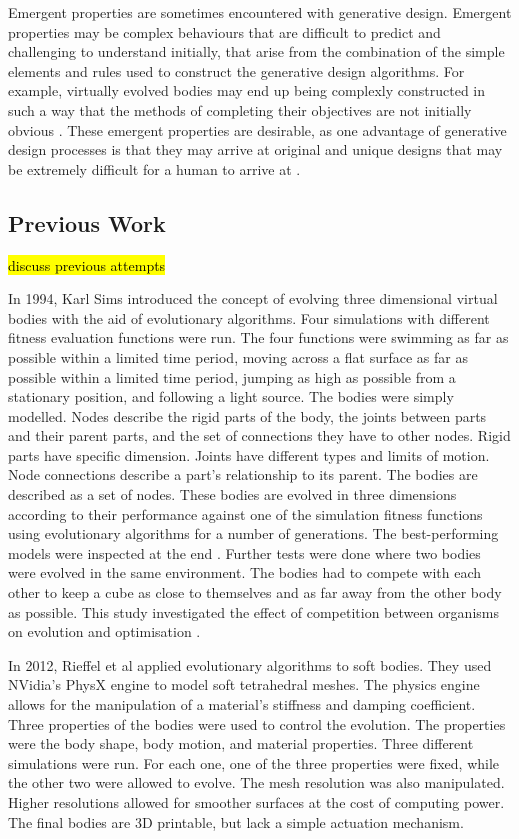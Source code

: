 Emergent properties are sometimes encountered with generative design. Emergent properties may be complex behaviours that are difficult to predict \cite{Aiguier2008} and challenging to understand initially, that arise from the combination of the simple elements and rules used to construct the generative design algorithms. For example, virtually evolved bodies may end up being complexly constructed in such a way that the methods of completing their objectives are not initially obvious \cite{Damper2000}. These emergent properties are desirable, as one advantage of generative design processes is that they may arrive at original and unique designs that may be extremely difficult for a human to arrive at \cite{Sims1994a}.

\subsection{Previous Work}

\hl{discuss previous attempts}

In 1994, Karl Sims introduced the concept of evolving three dimensional virtual bodies with the aid of evolutionary algorithms. Four simulations with different fitness evaluation functions were run. The four functions were swimming as far as possible within a limited time period, moving across a flat surface as far as possible within a limited time period, jumping as high as possible from a stationary position, and following a light source. The bodies were simply modelled. Nodes describe the rigid parts of the body, the joints between parts and their parent parts, and the set of connections they have to other nodes. Rigid parts have specific dimension. Joints have different types and limits of motion. Node connections describe a part's relationship to its parent. The bodies are described as a set of nodes. These bodies are evolved in three dimensions according to their performance against one of the simulation fitness functions using evolutionary algorithms for a number of generations. The best-performing models were inspected at the end \cite{Sims1994a}. Further tests were done where two bodies were evolved in the same environment. The bodies had to compete with each other to keep a cube as close to themselves and as far away from the other body as possible. This study investigated the effect of competition between organisms on evolution and optimisation \cite{Sims1994b}.

In 2012, Rieffel et al applied evolutionary algorithms to soft bodies. They used NVidia's PhysX engine to model soft tetrahedral meshes. The physics engine allows for the manipulation of a material's stiffness and damping coefficient. Three properties of the bodies were used to control the evolution. The properties were the body shape, body motion, and material properties. Three different simulations were run. For each one, one of the three properties were fixed, while the other two were allowed to evolve. The mesh resolution was also manipulated. Higher resolutions allowed for smoother surfaces at the cost of computing power. The final bodies are 3D printable, but lack a simple actuation mechanism. \cite{Rieffel2013}

